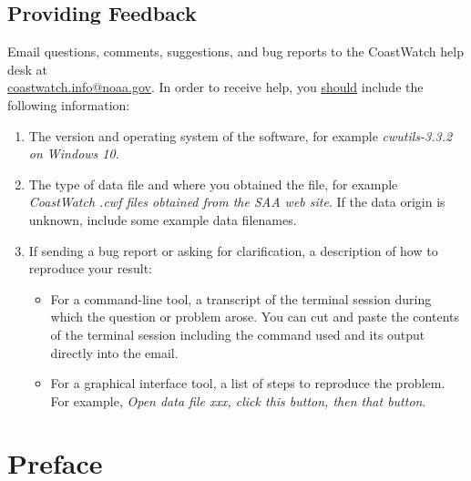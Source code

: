 \section*{Providing Feedback}

Email questions, comments, suggestions, and bug reports to the
CoastWatch help desk at \\
\href{mailto:coastwatch.info@noaa.gov}{coastwatch.info@noaa.gov}.
In order to receive help, you \underline{should} include the
following information:
\begin{enumerate}

  \item The version and operating system of the software, for
  example {\em cwutils-3.3.2 on Windows 10}.

  \item The type of data file and where you obtained the file,
  for example {\em CoastWatch .cwf files obtained from the SAA web
  site}.  If the data origin is unknown, include some example data
  filenames.

  \item If sending a bug report or asking for clarification, a
  description of how to reproduce your result:
  \begin{itemize}

    \item For a command-line tool, a transcript of the terminal
    session during which the question or problem arose.  You
    can cut and paste the contents
    of the terminal session including the command used and its output
    directly into the email.

    \item For a graphical interface tool, a list of steps to
    reproduce the problem.  For example, {\em
    Open data file xxx, click this button, then that button}.

  \end{itemize}

\end{enumerate}

\newpage

\tableofcontents
\newpage

\listoffigures
\newpage

\setcounter{page}{1}

\chapter*{Preface}

